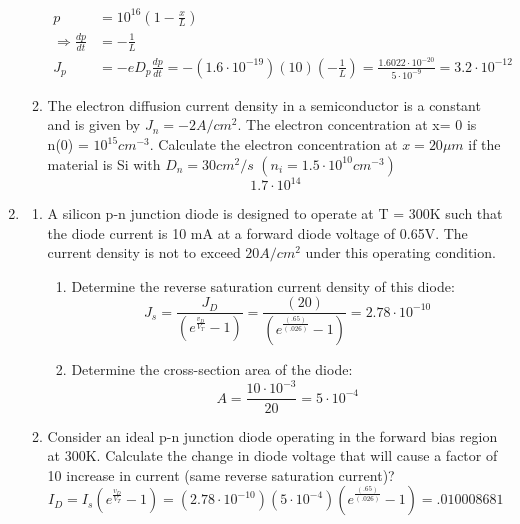 \documentclass{article}
\begin{document}
\begin{enumerate}
\begin{enumerate}
\begin{align}
        p &= 10^{16}\left(1 - \frac{x}{L}\right)\\
        \Rightarrow \frac{dp}{dt} &= - \frac{1}{L}\\
        J_p &= -eD_p\frac{dp}{dt} = -(1.6 \cdot 10^{-19})(10)(-\frac{1}{L}) = \frac{1.6022 \cdot 10^{-20}}{5\cdot10^{-9}} = 3.2\cdot10^{-12}
    \end{align}
    \item The electron diffusion current density in a semiconductor is a constant and is given by $J_n= -2A/cm^2$.  The  electron  concentration  at x=  0  is n(0)  =  $10^{15}cm^{-3}$.  Calculate  the  electron concentration at $x= 20 \mu m$ if the material is Si with $D_n=30 cm^2/s$ $  (n_i= 1.5\cdot10^{10}cm^{-3})$
    \begin{equation}
        1.7\cdot10^{14}
    \end{equation}
\end{enumerate}
\newpage
\item
\begin{enumerate}
    \item A silicon p-n junction diode is designed to operate at T = 300K such that the diode current is 10 mA at a forward diode voltage of 0.65V.  The current density is not to exceed $20A/cm^2$ under this operating condition.  
    \begin{enumerate}
        \item Determine the reverse saturation current density of this diode:
        \begin{equation}
            J_s = \frac{J_D}{(e^{\frac{v_D}{V_T}}-1)} =   \frac{(20)}{(e^{\frac{(.65)}{(.026)}}-1)} = 2.78\cdot10^{-10}
        \end{equation}
        \item Determine the cross-section area of the diode:
            \begin{equation}
                A = \frac{10\cdot10^{-3}}{20} = 5 \cdot 10^{-4}
            \end{equation}
    \end{enumerate}
    \item Consider an ideal p-n junction diode operating in the forward bias region at 300K. Calculate the  change  in  diode  voltage that  will  cause  a  factor  of  10  increase  in  current  (same  reverse saturation current)? 
        \begin{equation}
            I_D = I_s(e^{\frac{v_D}{V_T}}-1) = (2.78\cdot10^{-10})(5\cdot 10^{-4})(e^{\frac{(.65)}{(.026)}}-1) = .010008681
        \end{equation}

\end{enumerate}
\end{enumerate}
\end{document}
